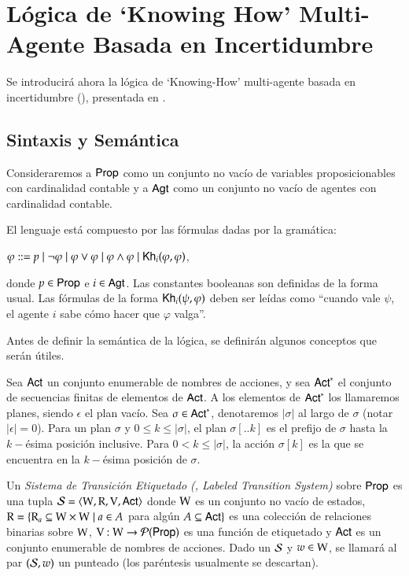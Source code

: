 \chapter{Lógica de `Knowing How' Multi-Agente Basada en Incertidumbre}
Se introducirá ahora la lógica de `Knowing-How' multi-agente basada en incertidumbre (\KHilogic), presentada en \cite{ArecesFSV25}.

\section{Sintaxis y Semántica}
Consideraremos a ${\rm \sf Prop}$ como un conjunto no vacío de variables proposicionables con cardinalidad contable 
y a ${\rm \sf Agt}$ como un conjunto no vacío de agentes con cardinalidad contable. 

\begin{definicion}
    El lenguaje \KHilogic está compuesto por las fórmulas dadas por la gramática:
    \begin{center}
        $\varphi ::= p \mid \neg \varphi \mid \varphi \vee \varphi \mid \varphi \wedge \varphi \mid \mathsf{Kh}_i(\varphi,\varphi)$,
    \end{center}
    donde $p \in {\rm \sf Prop}$ e $i \in {\rm \sf Agt}$. Las constantes booleanas son definidas de la forma usual. Las fórmulas de la forma 
    $\mathsf{Kh}_i(\psi, \varphi)$ deben ser leídas como ``cuando vale $\psi$, el agente $i$ sabe cómo hacer que $\varphi$ valga''.
\end{definicion}

Antes de definir la semántica de la lógica, se definirán algunos conceptos que serán útiles.

\begin{definicion}
    Sea ${\rm \sf Act}$ un conjunto enumerable de nombres de acciones, y sea ${\rm \sf Act}^*$ el conjunto de secuencias finitas de elementos de ${\rm \sf Act}$. 
    A los elementos de ${\rm \sf Act}^*$ los llamaremos planes, siendo $\epsilon$ el plan vacío. Sea $\sigma \in {\rm \sf Act}^*$, denotaremos $|\sigma|$ 
    al largo de $\sigma$ (notar $|\epsilon| = 0$). Para un plan $\sigma$ y $0 \leq k \leq |\sigma|$, el plan $\sigma[..k]$ es el prefijo 
    de $\sigma$ hasta la $k-$ésima posición inclusive. Para $0 < k \leq |\sigma|$, la acción $\sigma[k]$ es la que se encuentra en la 
    $k-$ésima posición de $\sigma$.  
\end{definicion}

\begin{definicion}
    Un \emph{Sistema de Transición Etiquetado (\lts, Labeled Transition System)} sobre ${\rm \sf Prop}$ es una tupla $\mathcal{S} = \langle \mathrm{W}, \mathrm{R}, \mathrm{V}, {\rm \sf Act} \rangle$ donde $\mathrm{W}$ es un conjunto no 
    vacío de estados, $\mathrm{R} = \{\mathrm{R}_a \subseteq \mathrm{W} \times \mathrm{W} \mid a \in A$ para algún $A \subseteq {\rm \sf Act}\}$ es una colección de relaciones binarias
    sobre $\mathrm{W}$, $\mathrm{V} : \mathrm{W} \to \mathcal{P}({\rm \sf Prop})$ es una función de etiquetado y ${\rm \sf Act}$ es un conjunto enumerable de nombres de acciones.
    Dado un \lts $\mathcal{S}$ y $w \in \mathrm{W}$, se llamará al par $(\mathcal{S},w)$ un \lts punteado (los paréntesis usualmente se descartan).
\end{definicion}


